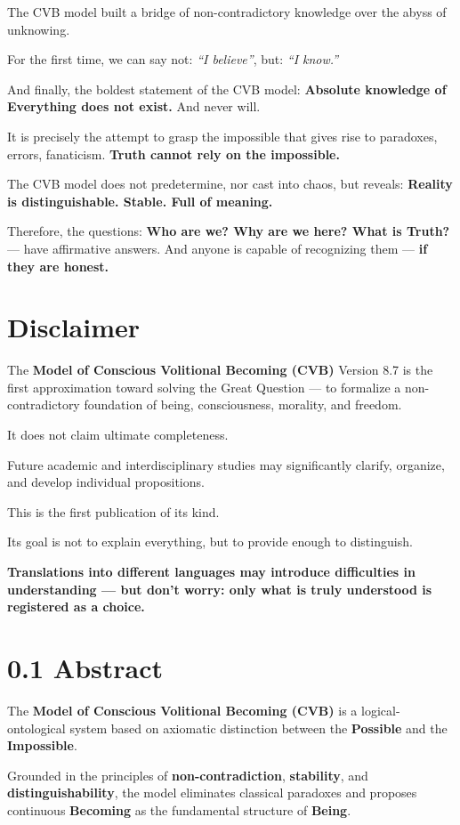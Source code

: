 \documentclass[12pt]{article}
\begin{document}
The CVB model built a bridge of non-contradictory knowledge
over the abyss of unknowing.

For the first time, we can say not: \emph{``I believe''}, but: \emph{``I know.''}

And finally, the boldest statement of the CVB model:
\textbf{Absolute knowledge of Everything does not exist.}
And never will.

It is precisely the attempt to grasp the impossible
that gives rise to paradoxes, errors, fanaticism.
\textbf{Truth cannot rely on the impossible.}

The CVB model does not predetermine, nor cast into chaos, but reveals:
\textbf{Reality is distinguishable. Stable. Full of meaning.}

Therefore, the questions:
\textbf{Who are we? Why are we here? What is Truth?}
— have affirmative answers.
And anyone is capable of recognizing them —
\textbf{if they are honest.}

\section*{Disclaimer}

The \textbf{Model of Conscious Volitional Becoming (CVB)} Version 8.7 is the first approximation toward solving the Great Question — to formalize a non-contradictory foundation of being, consciousness, morality, and freedom.

It does not claim ultimate completeness.

Future academic and interdisciplinary studies may significantly clarify, organize, and develop individual propositions.

This is the first publication of its kind.

Its goal is not to explain everything, but to provide enough to distinguish.

\textbf{Translations into different languages may introduce difficulties in understanding — but don’t worry: only what is truly understood is registered as a choice.}

\section*{0.1 Abstract}

The \textbf{Model of Conscious Volitional Becoming (CVB)} is a logical-ontological system based on axiomatic distinction between the \textbf{Possible} and the \textbf{Impossible}.

Grounded in the principles of \textbf{non-contradiction}, \textbf{stability}, and \textbf{distinguishability}, the model eliminates classical paradoxes and proposes continuous \textbf{Becoming} as the fundamental structure of \textbf{Being}.
\end{document}
